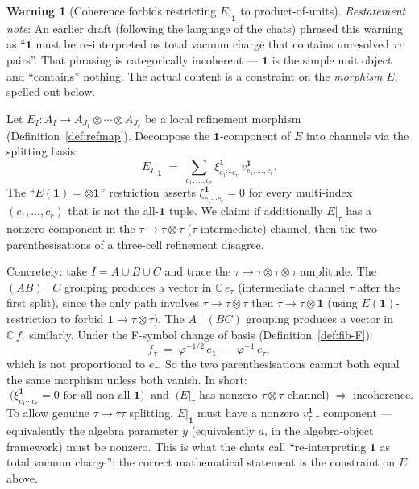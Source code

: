 \documentclass[11pt,a4paper]{article}
\theoremstyle{definition}
\newtheorem{warning}[definition]{Warning}
\newcommand{\one}{\mathbf{1}}
\begin{document}
\begin{warning}[Coherence forbids restricting $E|_{\one}$ to product-of-units]\label{warn:vac}
\emph{Restatement note}: An earlier draft (following the language of the
chats) phrased this warning as ``$\one$ must be re-interpreted as total
vacuum charge that contains unresolved $\tau\tau$ pairs''. That phrasing is
categorically incoherent --- $\one$ is the simple unit object and ``contains''
nothing. The actual content is a constraint on the \emph{morphism} $E$,
spelled out below.

Let $E_I: A_I\to A_{J_1}\otimes\cdots\otimes A_{J_r}$ be a local refinement
morphism (Definition~\ref{def:refmap}). Decompose the $\one$-component of $E$
into channels via the splitting basis:
\[
E_I|_{\one} \;=\; \sum_{c_1,\dots,c_r}
       \xi^{\one}_{c_1\cdots c_r}\,v^{\one}_{c_1,\dots,c_r}.
\]
The ``$E(\one) = \otimes\one$'' restriction asserts $\xi^{\one}_{c_1\cdots c_r} = 0$
for every multi-index $(c_1,\dots,c_r)$ that is not the all-$\one$ tuple. We
claim: if additionally $E|_\tau$ has a nonzero component in the
$\tau\to\tau\otimes\tau$ ($\tau$-intermediate) channel, then the two
parenthesisations of a three-cell refinement disagree.

Concretely: take $I = A\cup B\cup C$ and trace the
$\tau\to\tau\otimes\tau\otimes\tau$ amplitude. The $(AB)\mid C$ grouping
produces a vector in $\mathbb{C}\,e_\tau$
(intermediate channel $\tau$ after the first split), since the only path
involves $\tau\to\tau\otimes\tau$ then $\tau\to\tau\otimes\one$ (using
$E(\one)$-restriction to forbid $\one\to\tau\otimes\tau$). The
$A\mid(BC)$ grouping produces a vector in $\mathbb{C}\,f_\tau$ similarly.
Under the F-symbol change of basis (Definition~\ref{def:fib-F}):
\[
f_\tau \;=\; \varphi^{-1/2}\,e_\one \;-\; \varphi^{-1}\,e_\tau,
\]
which is not proportional to $e_\tau$. So the two parenthesisations cannot
both equal the same morphism unless both vanish. In short:
\[
\boxed{\;
\bigl(\xi^{\one}_{c_1\cdots c_r} = 0\text{ for all non-all-}\one\bigr)
\;\;\text{and}\;\;
\bigl(E|_\tau\text{ has nonzero }\tau\otimes\tau\text{ channel}\bigr)
\;\Longrightarrow\; \text{incoherence}.\;}
\]
To allow genuine $\tau\to\tau\tau$ splitting, $E|_\one$ must have a nonzero
$v^{\one}_{\tau,\tau}$ component --- equivalently the algebra parameter $y$
(equivalently $a$, in the algebra-object framework) must be nonzero. This is
what the chats call ``re-interpreting $\one$ as total vacuum charge''; the
correct mathematical statement is the constraint on $E$ above.
\end{warning}
\end{document}

